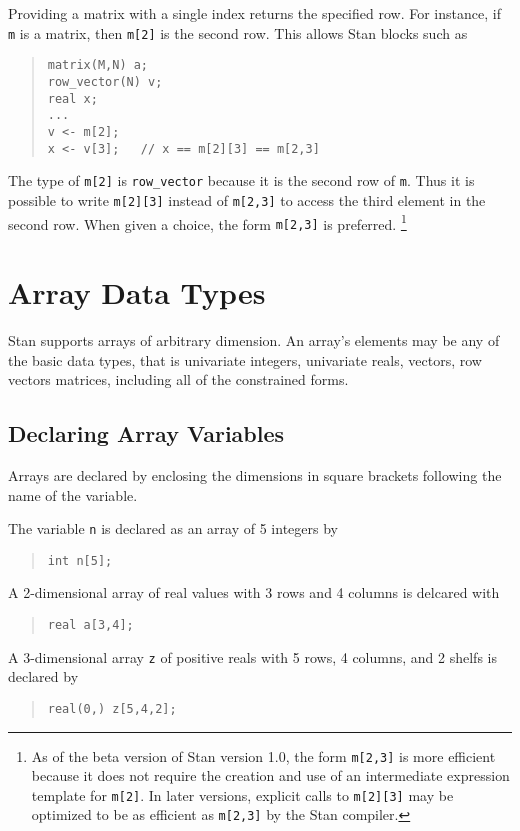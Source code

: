 \documentclass[10pt]{report}
\newcommand{\Stan}{Stan\xspace}
\newcommand{\code}[1]{{\tt #1}}
\begin{document}
Providing a matrix with a single index returns the specified row.  For
instance, if \code{m} is a matrix, then \code{m[2]} is the second row.
This allows \Stan blocks such as
%
\begin{quote}
\begin{Verbatim} 
matrix(M,N) a;    
row_vector(N) v;    
real x;
...
v <- m[2];   
x <- v[3];   // x == m[2][3] == m[2,3]
\end{Verbatim}
\end{quote}
% 
The type of \code{m[2]} is \code{row\_vector} because it is the second
row of \code{m}.  Thus it is possible to write \code{m[2][3]} instead
of \code{m[2,3]} to access the third element in the second row.  When
given a choice, the form \code{m[2,3]} is preferred.%
%
\footnote{As of the beta version of \Stan version 1.0, the form
  \code{m[2,3]} is more efficient because it does not require the
  creation and use of an intermediate expression template for
  \code{m[2]}.  In later versions, explicit calls to \code{m[2][3]}
  may be optimized to be as efficient as \code{m[2,3]} by the \Stan
  compiler.}


\section{Array Data Types}

\Stan supports arrays of arbitrary dimension.  An array's elements may
be any of the basic data types, that is univariate integers,
univariate reals, vectors, row vectors matrices, including all of the
constrained forms.

\subsection{Declaring Array Variables}

Arrays are declared by enclosing the dimensions in square brackets
following the name of the variable.

The variable \code{n} is declared as an array of 5 integers by
%
\begin{quote}
\begin{Verbatim}  
int n[5];
\end{Verbatim}
\end{quote}
% 
A 2-dimensional array of real values with 3 rows and 4 columns is
delcared with
%
\begin{quote}
\begin{Verbatim}  
real a[3,4];
\end{Verbatim}
\end{quote}
% 
A 3-dimensional array \code{z} of positive reals with 5 rows, 4
columns, and 2 shelfs is declared by
%
\begin{quote}
\begin{Verbatim} 
real(0,) z[5,4,2];
\end{Verbatim}
\end{quote}
%
\end{document}
